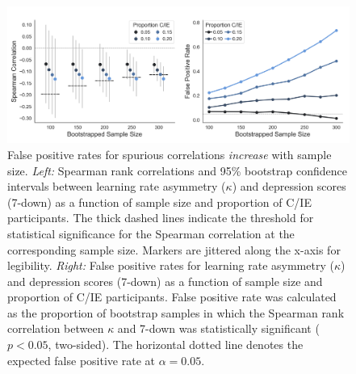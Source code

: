 \documentclass[a4paper,notitlepage,12pt]{article}
\begin{document}
\clearpage
\begin{figure}[h]
    \includegraphics[width=16cm]{../figures/main_03b.png}
    \centering
    \caption{False positive rates for spurious correlations \emph{increase} with sample size. \textit{Left:} Spearman rank correlations and 95\% bootstrap confidence intervals between learning rate asymmetry ($\kappa$) and depression scores (7-down) as a function of sample size and proportion of C/IE participants. The thick dashed lines indicate the threshold for statistical significance for the Spearman correlation at the corresponding sample size. Markers are jittered along the x-axis for legibility. \textit{Right:} False positive rates for learning rate asymmetry ($\kappa$) and depression scores (7-down) as a function of sample size and proportion of C/IE participants. False positive rate was calculated as the proportion of bootstrap samples in which the Spearman rank correlation between $\kappa$ and 7-down was statistically significant ($p<0.05$, two-sided). The horizontal dotted line denotes the expected false positive rate at $\alpha = 0.05$.}
    \label{fig:fig04}
\end{figure}

\clearpage
\printbibliography
\end{document}
